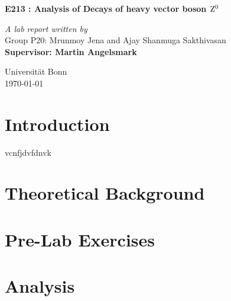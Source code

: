 \documentclass[a4paper]{report}
\begin{document}
\begin{onehalfspace}
\vspace*{0.5in}
\begin{center}
\begin{LARGE}
\textbf{E213 : Analysis of Decays of heavy vector boson $\rm Z^{0}$}\\ 
\end{LARGE}
\bigskip
\bigskip
\textit{A lab report written by}\\
Group P20: Mrunmoy Jena and Ajay Shanmuga Sakthivasan\\
\medskip
\textbf{Supervisor: Martin Angelsmark}\\
\vspace*{5in}
\begin{flushright}
Universit\"{a}t	Bonn\\
\today
\end{flushright}
\end{center}
\tableofcontents
\chapter*{Introduction}
vcnfjdvfdnvk
\chapter{Theoretical Background}

\chapter{Pre-Lab Exercises}


\chapter{Analysis}


\end{onehalfspace}
\printbibliography
\end{document}
